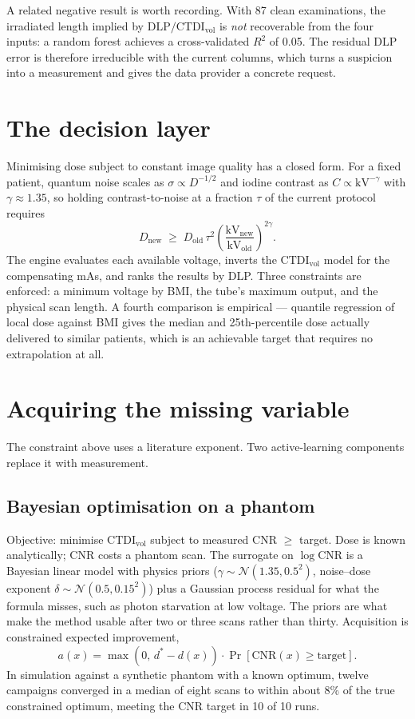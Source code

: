 \documentclass[10pt,a4paper,twocolumn]{article}
\newcommand{\ctdi}{\ensuremath{\mathrm{CTDI}_{\mathrm{vol}}}}
\begin{document}
A related negative result is worth recording. With 87 clean examinations, the irradiated length implied by
$\mathrm{DLP}/\ctdi$ is \emph{not} recoverable from the four inputs: a random forest achieves a
cross-validated $R^2$ of 0.05. The residual DLP error is therefore irreducible with the current columns, which
turns a suspicion into a measurement and gives the data provider a concrete request.

\section{The decision layer}

Minimising dose subject to constant image quality has a closed form. For a fixed patient, quantum noise scales
as $\sigma\propto D^{-1/2}$ and iodine contrast as $C\propto \mathrm{kV}^{-\gamma}$ with $\gamma\approx1.35$,
so holding contrast-to-noise at a fraction $\tau$ of the current protocol requires
\[
D_{\mathrm{new}}\;\ge\;D_{\mathrm{old}}\,\tau^{2}
\left(\frac{\mathrm{kV_{new}}}{\mathrm{kV_{old}}}\right)^{\!2\gamma}.
\]
The engine evaluates each available voltage, inverts the \ctdi{} model for the compensating mAs, and ranks the
results by DLP. Three constraints are enforced: a minimum voltage by BMI, the tube's maximum output, and the
physical scan length. A fourth comparison is empirical — quantile regression of local dose against BMI gives
the median and 25th-percentile dose actually delivered to similar patients, which is an achievable target that
requires no extrapolation at all.

\section{Acquiring the missing variable}

The constraint above uses a literature exponent. Two active-learning components replace it with measurement.

\subsection{Bayesian optimisation on a phantom}

Objective: minimise \ctdi{} subject to measured CNR $\ge$ target. Dose is known analytically; CNR costs a
phantom scan. The surrogate on $\log\mathrm{CNR}$ is a Bayesian linear model with physics priors
($\gamma\sim\mathcal{N}(1.35,0.5^2)$, noise--dose exponent $\delta\sim\mathcal{N}(0.5,0.15^2)$) plus a Gaussian
process residual for what the formula misses, such as photon starvation at low voltage. The priors are what
make the method usable after two or three scans rather than thirty. Acquisition is constrained expected
improvement,
\[
a(x)=\max\!\left(0,\,d^{*}-d(x)\right)\cdot\Pr\!\left[\mathrm{CNR}(x)\ge\text{target}\right].
\]
In simulation against a synthetic phantom with a known optimum, twelve campaigns converged in a median of eight
scans to within about 8\% of the true constrained optimum, meeting the CNR target in 10 of 10 runs.
\end{document}
